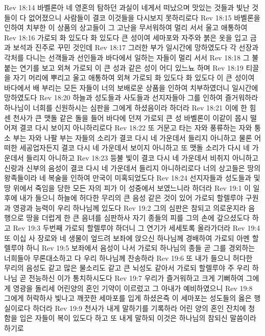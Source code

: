 Rev 18:14  바벨론아 네 영혼의 탐하던 과실이 네게서 떠났으며 맛있는 것들과 빛난 것들이 다 없어졌으니 사람들이 결코 이것들을 다시보지 못하리로다
Rev 18:15  바벨론을 인하여 치부한 이 상품의 상고들이 그 고난을 무서워하여 멀리 서서 울고 애통하여
Rev 18:16  가로되 화 있도다 화 있도다 큰 성이여 세마포와 자주와 붉은 옷을 입고 금과 보석과 진주로 꾸민 것인데
Rev 18:17  그러한 부가 일시간에 망하였도다 각 선장과 각처를 다니는 선객들과 선인들과 바다에서 일하는 자들이 멀리 서서
Rev 18:18  그 불붙는 연기를 보고 외쳐 가로되 이 큰 성과 같은 성이 어디 있느뇨 하며
Rev 18:19  티끌을 자기 머리에 뿌리고 울고 애통하여 외쳐 가로되 화 있도다 화 있도다 이 큰 성이여 바다에서 배 부리는 모든 자들이 너의 보배로운 상품을 인하여 치부하였더니 일시간에 망하였도다
Rev 18:20  하늘과 성도들과 사도들과 선지자들아 그를 인하여 즐거워하라 하나님이 너희를 신원하시는 심판을 그에게 하셨음이라 하더라
Rev 18:21  이에 한 힘센 천사가 큰 맷돌 같은 돌을 들어 바다에 던져 가로되 큰 성 바벨론이 이같이 몹시 떨어져 결코 다시 보이지 아니하리로다
Rev 18:22  또 거문고 타는 자와 풍류하는 자와 퉁소 부는 자와 나팔 부는 자들의 소리가 결코 다시 네 가운데서 들리지 아니하고 물론 어떠한 세공업자든지 결코 다시 네 가운데서 보이지 아니하고 또 맷돌 소리가 다시 네 가운데서 들리지 아니하고
Rev 18:23  등불 빛이 결코 다시 네 가운데서 비취지 아니하고 신랑과 신부의 음성이 결코 다시 네 가운데서 들리지 아니하리로다 너의 상고들은 땅의 왕족들이라 네 복술을 인하여 만국이 미혹되었도다
Rev 18:24  선지자들과 성도들과 및 땅 위에서 죽임을 당한 모든 자의 피가 이 성중에서 보였느니라 하더라
Rev 19:1  이 일 후에 내가 들으니 하늘에 허다한 무리의 큰 음성 같은 것이 있어 가로되 할렐루야 구원과 영광과 능력이 우리 하나님께 있도다
Rev 19:2  그의 심판은 참되고 의로운지라 음행으로 땅을 더럽게 한 큰 음녀를 심판하사 자기 종들의 피를 그의 손에 갚으셨도다 하고
Rev 19:3  두번째 가로되 할렐루야 하더니 그 연기가 세세토록 올라가더라
Rev 19:4  또 이십 사 장로와 네 생물이 엎드려 보좌에 앉으신 하나님께 경배하여 가로되 아멘 할렐루야 하니
Rev 19:5  보좌에서 음성이 나서 가로되 하나님의 종들 곧 그를 경외하는 너희들아 무론대소하고 다 우리 하나님께 찬송하라
Rev 19:6  또 내가 들으니 허다한 무리의 음성도 같고 많은 물소리도 같고 큰 뇌성도 같아서 가로되 할렐루야 주 우리 하나님 곧 전능하신 이가 통치하시도다
Rev 19:7  우리가 즐거워하고 크게 기뻐하여 그에게 영광을 돌리세 어린양의 혼인 기약이 이르렀고 그 아내가 예비하였으니
Rev 19:8  그에게 허락하사 빛나고 깨끗한 세마포를 입게 하셨은즉 이 세마포는 성도들의 옳은 행실이로다 하더라
Rev 19:9  천사가 내게 말하기를 기록하라 어린 양의 혼인 잔치에 청함을 입은 자들이 복이 있도다 하고 또 내게 말하되 이것은 하나님의 참되신 말씀이라 하기로
